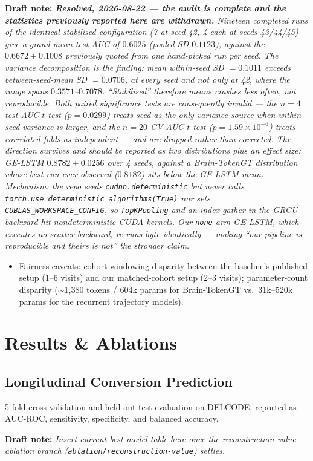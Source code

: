 \documentclass[11pt,a4paper]{article}
\newcommand{\draftnote}[1]{%
  \par\noindent\textbf{Draft note:} \textit{#1}\par\vspace{0.5\baselineskip}%
}
\begin{document}
\draftnote{\textbf{Resolved, 2026-08-22 --- the audit is complete and the
  statistics previously reported here are withdrawn.} Nineteen completed runs of the
  identical stabilised configuration (7 at seed 42, 4 each at seeds 43/44/45) give a grand
  mean test AUC of $0.6025$ (pooled SD $0.1123$), against the $0.6672 \pm 0.1008$
  previously quoted from one hand-picked run per seed. The variance decomposition is the
  finding: mean within-seed SD $= 0.1011$ exceeds between-seed-mean SD $= 0.0706$, at every
  seed and not only at 42, where the range spans $0.3571$--$0.7078$. ``Stabilised''
  therefore means \emph{crashes less often}, not \emph{reproducible}. Both paired
  significance tests are consequently invalid --- the $n{=}4$ test-AUC $t$-test
  ($p = 0.0299$) treats seed as the only variance source when within-seed variance is
  larger, and the $n{=}20$ CV-AUC $t$-test ($p = 1.59\times10^{-6}$) treats correlated
  folds as independent --- and are dropped rather than corrected. The \emph{direction}
  survives and should be reported as two distributions plus an effect size: GE-LSTM
  $0.8782 \pm 0.0256$ over 4 seeds, against a Brain-TokenGT distribution whose best run
  ever observed ($0.8182$) sits below the GE-LSTM mean. Mechanism: the repo seeds
  \texttt{cudnn.deterministic} but never calls
  \texttt{torch.use\_deterministic\_algorithms(True)} nor sets
  \texttt{CUBLAS\_WORKSPACE\_CONFIG}, so \texttt{TopKPooling} and an index-gather in the
  GRCU backward hit nondeterministic CUDA kernels. Our \texttt{none}-arm GE-LSTM, which
  executes no scatter backward, re-runs byte-identically --- making
  \emph{``our pipeline is reproducible and theirs is not''} the stronger claim.}

\begin{itemize}
  \item Fairness caveats: cohort-windowing disparity between the baseline's
    published setup (1--6 visits) and our matched-cohort setup (2--3 visits);
    parameter-count disparity ($\sim$1{,}380 tokens / 604k params for
    Brain-TokenGT vs.\ 31k--520k params for the recurrent trajectory models).
\end{itemize}

\section{Results \& Ablations}

\subsection{Longitudinal Conversion Prediction}
5-fold cross-validation and held-out test evaluation on DELCODE, reported as
AUC-ROC, sensitivity, specificity, and balanced accuracy.
\draftnote{Insert current best-model table here once the reconstruction-value
  ablation branch (\texttt{ablation/reconstruction-value}) settles.}
\end{document}
